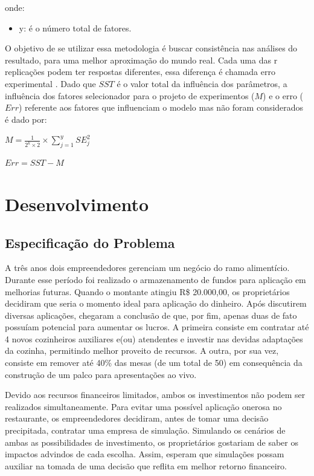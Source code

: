 \documentclass[pt,disc,oneside]{ufscpgeasthesis}
\begin{document}
			onde:

			\begin{itemize}
				\item{y:} é o número total de fatores.
			\end{itemize}

			O objetivo de se utilizar essa metodologia é buscar consistência nas análises do resultado, para uma melhor aproximação do mundo real.
			Cada uma das r replicações podem ter respostas diferentes, essa diferença é chamada erro experimental \cite{Freitas}.
			Dado que $SST$ é o valor total da influência dos parâmetros, a influência dos fatores selecionador para o projeto de experimentos ($M$) e o erro ($Err$) referente aos fatores que influenciam o modelo mas não foram considerados é dado por:

			\begin{center}
				\LARGE{$M = \frac{1}{2^k \times 2} \times \sum_{j=1}^{y} SE_j^2$}
			\end{center}

			\begin{center}
				\LARGE{$Err = SST - M$}
			\end{center}

	\chapter{Desenvolvimento}
	\label{cap:desenvolvimento}

		\section{Especificação do Problema}
		\label{sec:especificacao}

			A três anos dois empreendedores gerenciam um negócio do ramo alimentício.
			Durante esse período foi realizado o armazenamento de fundos para aplicação em melhorias futuras.
			Quando o montante atingiu R\$ 20.000,00, os proprietários decidiram que seria o momento ideal para aplicação do dinheiro.
			Após discutirem diversas aplicações, chegaram a conclusão de que, por fim, apenas duas de fato possuíam potencial para aumentar os lucros.
			A primeira consiste em contratar até 4 novos cozinheiros auxiliares e(ou) atendentes e investir nas devidas adaptações da cozinha, permitindo melhor proveito de recursos.
			A outra, por sua vez, consiste em remover até 40\% das mesas (de um total de 50) em consequência da construção de um palco para apresentações ao vivo.

			Devido aos recursos financeiros limitados, ambos os investimentos não podem ser realizados simultaneamente.
			Para evitar uma possível aplicação onerosa no restaurante, os empreendedores decidiram, antes de tomar uma decisão precipitada, contratar uma empresa de simulação.
			Simulando os cenários de ambas as possibilidades de investimento, os proprietários gostariam de saber os impactos advindos de cada escolha.
			Assim, esperam que simulações possam auxiliar na tomada de uma decisão que reflita em melhor retorno financeiro.
\end{document}
